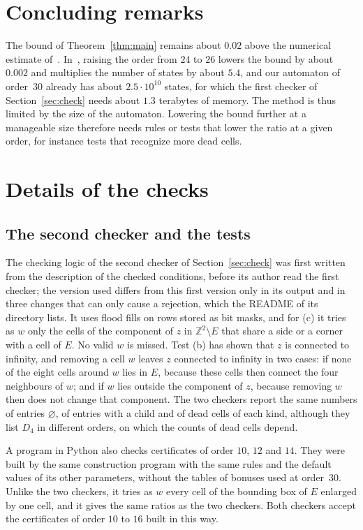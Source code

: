 \documentclass[11pt]{amsart}
\theoremstyle{definition}
\theoremstyle{remark}
\numberwithin{equation}{section}
\newcommand{\Z}{\mathbb{Z}}
\newcommand{\Kmax}{30}
\begin{document}
\section{Concluding remarks}\label{sec:end}

The bound of Theorem~\ref{thm:main} remains about $0.02$ above the numerical estimate of~\cite{JSG16}. In~\cite{Cou25}, raising the order from $24$ to $26$ lowers the bound by about $0.002$ and multiplies the number of states by about $5.4$, and our automaton of order~$\Kmax$ already has about $2.5\cdot10^{10}$ states, for which the first checker of Section~\ref{sec:check} needs about $1.3$ terabytes of memory. The method is thus limited by the size of the automaton. Lowering the bound further at a manageable size therefore needs rules or tests that lower the ratio at a given order, for instance tests that recognize more dead cells.

\appendix
\section{Details of the checks}\label{app:checks}

\subsection{The second checker and the tests}
The checking logic of the second checker of Section~\ref{sec:check} was first written from the description of the checked conditions, before its author read the first checker; the version used differs from this first version only in its output and in three changes that can only cause a rejection, which the README of its directory lists. It uses flood fills on rows stored as bit masks, and for (c) it tries as $w$ only the cells of the component of $z$ in $\Z^2\setminus E$ that share a side or a corner with a cell of $E$. No valid $w$ is missed. Test (b) has shown that $z$ is connected to infinity, and removing a cell $w$ leaves $z$ connected to infinity in two cases: if none of the eight cells around $w$ lies in $E$, because these cells then connect the four neighbours of $w$; and if $w$ lies outside the component of $z$, because removing $w$ then does not change that component. The two checkers report the same numbers of entries $\varnothing$, of entries with a child and of dead cells of each kind, although they list $D_4$ in different orders, on which the counts of dead cells depend.

A program in Python also checks certificates of order $10$, $12$ and $14$. They were built by the same construction program with the same rules and the default values of its other parameters, without the tables of bonuses used at order~$\Kmax$. Unlike the two checkers, it tries as $w$ every cell of the bounding box of $E$ enlarged by one cell, and it gives the same ratios as the two checkers. Both checkers accept the certificates of order $10$ to $16$ built in this way.
\end{document}

